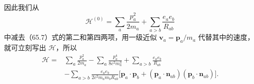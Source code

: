 因此我们从
\begin{equation*}
  \mathcal{H}^{(0)}=\sum_a\frac{p_a^2}{2m_a}
  +\sum_{a>b}\frac{e_ae_b}{R_{ab}}
\end{equation*}
中减去（65.7）式的第二和第四两项，用一级近似 $\boldsymbol{v}_a=\boldsymbol{p}_a/m_a$ 代替其中的速度，就可立刻写出 $\mathcal{H}$，所以
\begin{equation}
\begin{aligned}
  \mathcal{H}={}&\sum_a\frac{p_a^2}{2m_a}
  -\sum_a\frac{p_a^4}{8c^2m_a^3}
  +\sum_{a>b}\frac{e_ae_b}{R_{ab}}\\
  &-\sum_{a>b}\frac{e_ae_b}{2c^2m_am_bR_{ab}}
  \bigl[\boldsymbol{p}_a\cdot\boldsymbol{p}_b
  +(\boldsymbol{p}_a\cdot\boldsymbol{n}_{ab})
  (\boldsymbol{p}_b\cdot\boldsymbol{n}_{ab})\bigr].
\end{aligned}
\end{equation}

